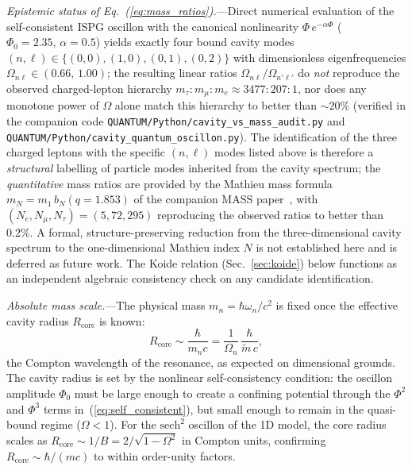 \documentclass[aps,prd,onecolumn,superscriptaddress,nofootinbib,showpacs,12pt,notitlepage]{revtex4-2}
\begin{document}
\textit{Epistemic status of
Eq.~(\ref{eq:mass_ratios}).}---Direct numerical evaluation
of the self-consistent ISPG oscillon with the canonical
nonlinearity $\Phi\,e^{-\alpha\Phi}$ ($\Phi_0 = 2.35,\,
\alpha = 0.5$) yields exactly four bound cavity modes
$(n,\ell)\in\{(0,0),(1,0),(0,1),(0,2)\}$ with dimensionless
eigenfrequencies $\Omega_{n\ell}\in(0.66,\,1.00)$; the
resulting linear ratios $\Omega_{n\ell}/\Omega_{n'\ell'}$
do \emph{not} reproduce the observed charged-lepton
hierarchy $m_\tau:m_\mu:m_e\approx 3477:207:1$, nor does
any monotone power of $\Omega$ alone match this hierarchy
to better than $\sim 20\%$ (verified in the companion
code \texttt{QUANTUM/Python/cavity\_vs\_mass\_audit.py}
and \texttt{QUANTUM/Python/cavity\_quantum\_oscillon.py}).
The identification
of the three charged leptons with the specific $(n,\ell)$
modes listed above is therefore a \emph{structural}
labelling of particle modes inherited from the cavity
spectrum; the \emph{quantitative} mass ratios are
provided by the Mathieu mass formula
$m_N = m_1\,b_N(q{=}1.853)$ of the companion MASS
paper~\cite{Lotishvili2026Mass}, with
$(N_e,N_\mu,N_\tau) = (5,72,295)$ reproducing the
observed ratios to better than $0.2\%$.  A formal,
structure-preserving reduction from the three-dimensional
cavity spectrum to the one-dimensional Mathieu index $N$
is not established here and is deferred as future work.
The Koide relation (Sec.~\ref{sec:koide}) below functions
as an independent algebraic consistency check on any
candidate identification.

\textit{Absolute mass scale.}---The physical mass
$m_n = \hbar\omega_n/c^2$ is fixed once the effective
cavity radius $R_{\mathrm{core}}$ is known:
\begin{equation}\label{eq:R_core}
  R_{\mathrm{core}}
  \sim \frac{\hbar}{m_n c}
  = \frac{1}{\Omega_n}\,
    \frac{\hbar}{\tilde{m}\,c},
\end{equation}
the Compton wavelength of the resonance, as expected
on dimensional grounds.  The cavity radius is set by
the nonlinear self-consistency condition: the oscillon
amplitude $\Phi_0$ must be large enough to create a
confining potential through the $\Phi^2$ and $\Phi^3$
terms in~(\ref{eq:self_consistent}), but small enough
to remain in the quasi-bound regime ($\Omega < 1$).  For
the $\mathrm{sech}^2$ oscillon of the 1D model, the core
radius scales as $R_{\mathrm{core}} \sim 1/B =
2/\sqrt{1-\Omega^2}$ in Compton units, confirming
$R_{\mathrm{core}} \sim \hbar/(mc)$ to within
order-unity factors.
\end{document}
